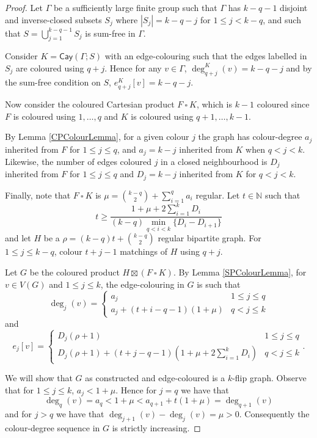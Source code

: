 \documentclass[a4paper,12pt]{article}
\newcommand{\cay}[2]{\mathsf{Cay}\left(#1 ; #2\right)}
\begin{document}
\begin{proof}
Let $\Gamma$ be a sufficiently large finite group such that $\Gamma$ has $k - q - 1$ disjoint and inverse-closed subsets $S_j$ where $|S_j| = k - q - j$ for $1 \leq j < k - q$, and such that $S = \bigcup\limits_{j = 1}^{k - q - 1} S_j$ is sum-free in $\Gamma$. 

Consider $K = \cay{\Gamma}{S}$ with an edge-colouring such that the edges labelled in $S_j$ are coloured using $q + j$. Hence for any $v \in \Gamma$, $\deg_{q+j}^K (v) = k - q - j$ and by the sum-free condition on $S$, $e_{q+j}^K [v] = k - q - j$.

Now consider the coloured Cartesian product $F \ \square \ K$, which is $k - 1$ coloured since $F$ is coloured using $1, \dots, q$ and $K$ is coloured using $q + 1, \dots, k - 1$. 

By Lemma \ref{CPColourLemma}, for a given colour $j$ the graph has colour-degree $a_j$ inherited from $F$ for $1 \leq j \leq q$, and $a_j = k - j$ inherited from $K$ when $q < j < k$. Likewise, the number of edges coloured $j$ in a closed neighbourhood is $D_j$ inherited from $F$ for $1 \leq j \leq q$ and $D_j = k - j$ inherited from $K$ for $q < j < k$. 

Finally, note that $F \ \square \ K$ is $\mu = \binom{k-q}{2} + \sum\limits_{i = 1}^q a_i$ regular. Let $t \in \mathbb{N}$ such that $$t \geq \dfrac{1 + \mu + 2\sum\limits_{i = 1}^k D_i}{(k-q)\min\limits_{q < i < k}\{D_i - D_{i+1}\}}$$ and let $H$ be a $\rho = (k-q)t + \binom{k-q}{2}$ regular bipartite graph. For $1 \leq j \leq k - q$, colour $t + j - 1$ matchings of $H$ using $q + j$. 

Let $G$ be the coloured product $H \boxtimes (F \ \square \ K)$. By Lemma \ref{SPColourLemma}, for $v \in V(G)$ and $1 \leq j \leq k$, the edge-colouring in $G$ is such that $$\deg_j (v) = 
\begin{cases} 
a_j & 1 \leq j \leq q \\
a_j + (t + i - q - 1)(1 + \mu)& q < j \leq k
\end{cases}
$$ and $$e_j [v] = \begin{cases} 
D_j (\rho + 1) & 1 \leq j \leq q \\
D_j (\rho + 1) + (t + j - q - 1)\left(1 + \mu + 2\sum\limits_{i=1}^k D_i\right)& q < j \leq k
\end{cases}.
$$

We will show that $G$ as constructed and edge-coloured is a $k$-flip graph. Observe that for $1 \leq j \leq k$, $a_j < 1 + \mu$. Hence for $j = q$ we have that $$\deg_q (v) = a_q < 1 + \mu < a_{q+1} + t(1 + \mu) = \deg_{q+1} (v)$$ and for $j > q$ we have that $\deg_{j+1} (v) - \deg_j (v) = \mu > 0$. Consequently the colour-degree sequence in $G$ is strictly increasing.


\end{proof}
\end{document}
